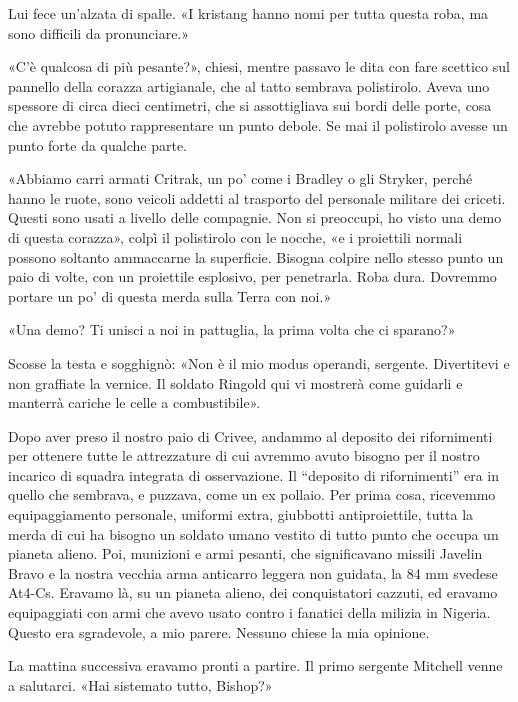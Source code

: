 Lui fece un'alzata di spalle. «I kristang hanno nomi per tutta questa
roba, ma sono difficili da pronunciare.»

«C'è qualcosa di più pesante?», chiesi, mentre passavo le dita con fare
scettico sul pannello della corazza artigianale, che al tatto sembrava
polistirolo. Aveva uno spessore di circa dieci centimetri, che si
assottigliava sui bordi delle porte, cosa che avrebbe potuto
rappresentare un punto debole. Se mai il polistirolo avesse un punto
forte da qualche parte.

«Abbiamo carri armati Critrak, un po' come i Bradley o gli Stryker,
perché hanno le ruote, sono veicoli addetti al trasporto del personale
militare dei criceti. Questi sono usati a livello delle compagnie. Non
si preoccupi, ho visto una demo di questa corazza», colpì il polistirolo
con le nocche, «e i proiettili normali possono soltanto ammaccarne la
superficie. Bisogna colpire nello stesso punto un paio di volte, con un
proiettile esplosivo, per penetrarla. Roba dura. Dovremmo portare un po'
di questa merda sulla Terra con noi.»

«Una demo? Ti unisci a noi in pattuglia, la prima volta che ci sparano?»

Scosse la testa e sogghignò: «Non è il mio modus operandi, sergente.
Divertitevi e non graffiate la vernice. Il soldato Ringold qui vi
mostrerà come guidarli e manterrà cariche le celle a combustibile».

\hfill\break

Dopo aver preso il nostro paio di Crivee, andammo al deposito dei
rifornimenti per ottenere tutte le attrezzature di cui avremmo avuto
bisogno per il nostro incarico di squadra integrata di osservazione. Il
``deposito di rifornimenti'' era in quello che sembrava, e puzzava, come
un ex pollaio. Per prima cosa, ricevemmo equipaggiamento personale,
uniformi extra, giubbotti antiproiettile, tutta la merda di cui ha
bisogno un soldato umano vestito di tutto punto che occupa un pianeta
alieno. Poi, munizioni e armi pesanti, che significavano missili Javelin
Bravo e la nostra vecchia arma anticarro leggera non guidata, la 84 mm
svedese At4-Cs. Eravamo là, su un pianeta alieno, dei conquistatori
cazzuti, ed eravamo equipaggiati con armi che avevo usato contro i
fanatici della milizia in Nigeria. Questo era sgradevole, a mio parere.
Nessuno chiese la mia opinione.

\hfill\break

La mattina successiva eravamo pronti a partire. Il primo sergente
Mitchell venne a salutarci. «Hai sistemato tutto, Bishop?»


